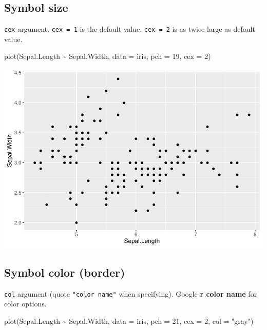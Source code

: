 \documentclass[
]{book}
\newenvironment{Shaded}{\begin{snugshade}}{\end{snugshade}}
\newcommand{\AttributeTok}[1]{\textcolor[rgb]{0.77,0.63,0.00}{#1}}
\newcommand{\DecValTok}[1]{\textcolor[rgb]{0.00,0.00,0.81}{#1}}
\newcommand{\FunctionTok}[1]{\textcolor[rgb]{0.00,0.00,0.00}{#1}}
\newcommand{\NormalTok}[1]{#1}
\newcommand{\SpecialCharTok}[1]{\textcolor[rgb]{0.00,0.00,0.00}{#1}}
\newcommand{\StringTok}[1]{\textcolor[rgb]{0.31,0.60,0.02}{#1}}
\begin{document}
\hypertarget{symbol-size}{%
\subsection{Symbol size}\label{symbol-size}}

\texttt{cex} argument. \texttt{cex\ =\ 1} is the default value. \texttt{cex\ =\ 2} is as twice large as default value.

\begin{Shaded}
\begin{Highlighting}[]
\FunctionTok{plot}\NormalTok{(Sepal.Length }\SpecialCharTok{\textasciitilde{}}\NormalTok{ Sepal.Width, }\AttributeTok{data =}\NormalTok{ iris,}
     \AttributeTok{pch =} \DecValTok{19}\NormalTok{, }\AttributeTok{cex =} \DecValTok{2}\NormalTok{)}
\end{Highlighting}
\end{Shaded}

\begin{center}\includegraphics{biostats_files/figure-latex/unnamed-chunk-118-1} \end{center}

\hypertarget{symbol-color-border}{%
\subsection{Symbol color (border)}\label{symbol-color-border}}

\texttt{col} argument (quote \texttt{"color\ name"} when specifying). Google \textbf{r color name} for color options.

\begin{Shaded}
\begin{Highlighting}[]
\FunctionTok{plot}\NormalTok{(Sepal.Length }\SpecialCharTok{\textasciitilde{}}\NormalTok{ Sepal.Width, }\AttributeTok{data =}\NormalTok{ iris,}
     \AttributeTok{pch =} \DecValTok{21}\NormalTok{, }\AttributeTok{cex =} \DecValTok{2}\NormalTok{, }\AttributeTok{col =} \StringTok{"gray"}\NormalTok{)}
\end{Highlighting}
\end{Shaded}
\end{document}
